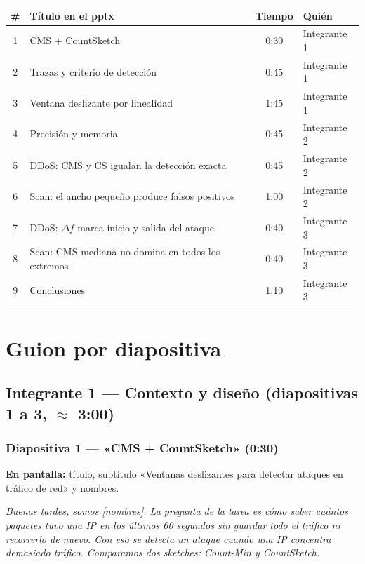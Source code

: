 \documentclass[11pt]{article}
\newcommand{\decir}[1]{%
  \par\noindent\colorbox{guion}{\parbox{\dimexpr\linewidth-2\fboxsep}{\small\textit{#1}}}\par\medskip}
\begin{document}
\begin{center}
\begin{tabular}{clcl}
\toprule
\# & Título en el pptx & Tiempo & Quién \\
\midrule
1 & CMS + CountSketch & 0:30 & Integrante 1 \\
2 & Trazas y criterio de detección & 0:45 & Integrante 1 \\
3 & Ventana deslizante por linealidad & 1:45 & Integrante 1 \\
4 & Precisión y memoria & 0:45 & Integrante 2 \\
5 & DDoS: CMS y CS igualan la detección exacta & 0:45 & Integrante 2 \\
6 & Scan: el ancho pequeño produce falsos positivos & 1:00 & Integrante 2 \\
7 & DDoS: $\Delta f$ marca inicio y salida del ataque & 0:40 & Integrante 3 \\
8 & Scan: CMS-mediana no domina en todos los extremos & 0:40 & Integrante 3 \\
9 & Conclusiones & 1:10 & Integrante 3 \\
\bottomrule
\end{tabular}
\end{center}

\section{Guion por diapositiva}

\subsection{Integrante 1 — Contexto y diseño (diapositivas 1 a 3, $\approx$ 3:00)}

\subsubsection*{Diapositiva 1 — «CMS + CountSketch» (0:30)}
\textbf{En pantalla:} título, subtítulo «Ventanas deslizantes para detectar ataques en tráfico de red» y nombres.
\decir{Buenas tardes, somos [nombres]. La pregunta de la tarea es cómo saber cuántos paquetes tuvo una IP en los últimos 60 segundos sin guardar todo el tráfico ni recorrerlo de nuevo. Con eso se detecta un ataque cuando una IP concentra demasiado tráfico. Comparamos dos sketches: Count-Min y CountSketch.}
\end{document}
